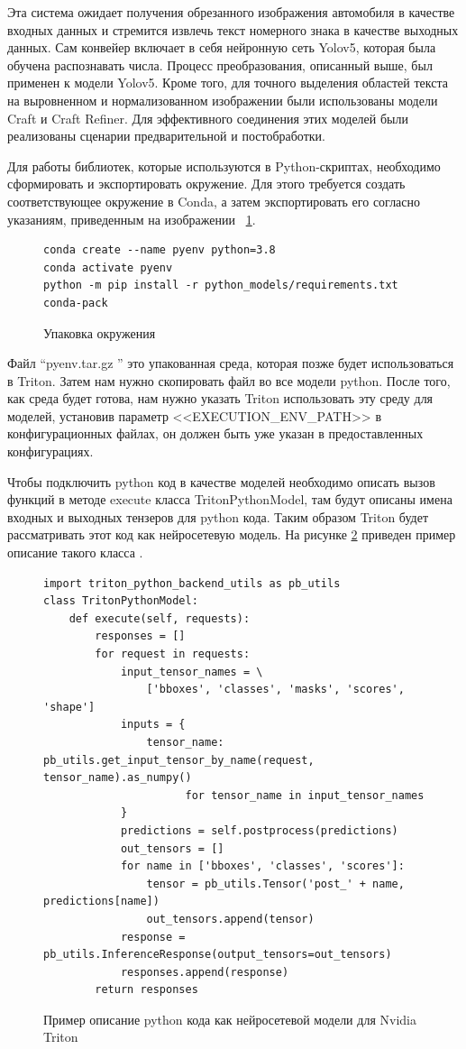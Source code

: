 Эта система ожидает получения обрезанного изображения автомобиля в качестве входных данных и стремится извлечь текст номерного знака в качестве выходных данных. Сам конвейер включает в себя нейронную сеть Yolov5, которая была обучена распознавать числа. Процесс преобразования, описанный выше, был применен к модели Yolov5. Кроме того, для точного выделения областей текста на выровненном и нормализованном изображении были использованы модели Craft и Craft Refiner. Для эффективного соединения этих моделей были реализованы сценарии предварительной и постобработки.

Для работы библиотек, которые используются в Python-скриптах, необходимо сформировать и экспортировать окружение. Для этого требуется создать соответствующее окружение в Conda, а затем экспортировать его согласно указаниям, приведенным на изображении ~\ref{src:src2_7}.

\begin{figure}
\begin{lstlisting}
conda create --name pyenv python=3.8
conda activate pyenv
python -m pip install -r python_models/requirements.txt
conda-pack  
\end{lstlisting}
\caption{Упаковка окружения}
\label{src:src2_7}
\end{figure}

Файл “pyenv.tar.gz ” это упакованная среда, которая позже будет использоваться в Triton. Затем нам нужно скопировать файл во все модели python. После того, как среда будет готова, нам нужно указать Triton использовать эту среду для моделей, установив параметр <<EXECUTION\_ENV\_PATH>> в конфигурационных файлах, он должен быть уже указан в предоставленных конфигурациях. 

Чтобы подключить python код в качестве моделей необходимо описать вызов функций в методе execute класса TritonPythonModel, там будут описаны имена входных и выходных тензеров для python кода. Таким образом Triton будет рассматривать этот код как нейросетевую модель. На рисунке \ref{src:src3_3} приведен пример описание такого класса .

\begin{figure}
\begin{lstlisting}
import triton_python_backend_utils as pb_utils
class TritonPythonModel:
    def execute(self, requests):
        responses = []
        for request in requests:
            input_tensor_names = \
                ['bboxes', 'classes', 'masks', 'scores', 'shape']
            inputs = {
                tensor_name: pb_utils.get_input_tensor_by_name(request, tensor_name).as_numpy()
                      for tensor_name in input_tensor_names
            }
            predictions = self.postprocess(predictions)
            out_tensors = []
            for name in ['bboxes', 'classes', 'scores']:
                tensor = pb_utils.Tensor('post_' + name, predictions[name])
                out_tensors.append(tensor)
            response = pb_utils.InferenceResponse(output_tensors=out_tensors)
            responses.append(response)
        return responses
\end{lstlisting}
\caption{Пример описание python кода как нейросетевой модели для Nvidia Triton}
\label{src:src3_3}
\end{figure}


